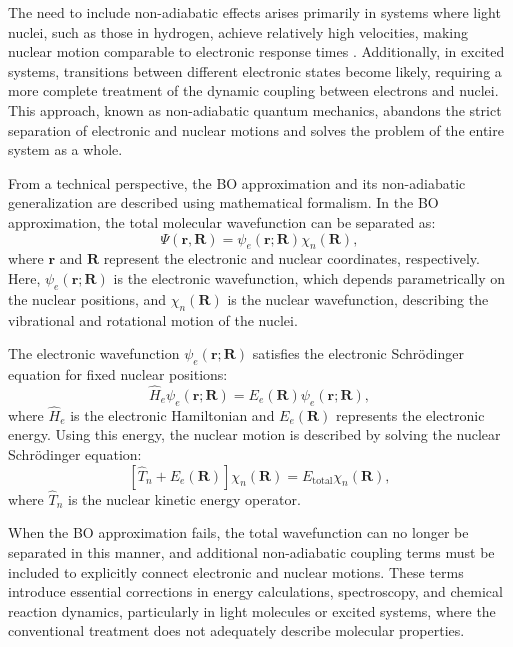 \documentclass[%
 reprint,
 amsmath,amssymb,
 aps,
]{revtex4-2}
\begin{document}
The need to include non-adiabatic effects arises primarily in systems where light nuclei, such as those in hydrogen, achieve relatively high velocities, making nuclear motion comparable to electronic response times \cite{stanke2013relativistic}. Additionally, in excited systems, transitions between different electronic states become likely, requiring a more complete treatment of the dynamic coupling between electrons and nuclei. This approach, known as non-adiabatic quantum mechanics, abandons the strict separation of electronic and nuclear motions and solves the problem of the entire system as a whole.

From a technical perspective, the BO approximation and its non-adiabatic generalization are described using mathematical formalism. In the BO approximation, the total molecular wavefunction can be separated as:
\begin{equation}
\Psi(\mathbf{r}, \mathbf{R}) = \psi_e(\mathbf{r}; \mathbf{R}) \chi_n(\mathbf{R}),
\label{eq:wavefunction}
\end{equation}
where $\mathbf{r}$ and $\mathbf{R}$ represent the electronic and nuclear coordinates, respectively. Here, $\psi_e(\mathbf{r}; \mathbf{R})$ is the electronic wavefunction, which depends parametrically on the nuclear positions, and $\chi_n(\mathbf{R})$ is the nuclear wavefunction, describing the vibrational and rotational motion of the nuclei.

The electronic wavefunction $\psi_e(\mathbf{r}; \mathbf{R})$ satisfies the electronic Schrödinger equation for fixed nuclear positions:
\begin{equation}
\hat{H}_e \psi_e(\mathbf{r}; \mathbf{R}) = E_e(\mathbf{R}) \psi_e(\mathbf{r}; \mathbf{R}),
\label{eq:electronic}
\end{equation}
where $\hat{H}_e$ is the electronic Hamiltonian and $E_e(\mathbf{R})$ represents the electronic energy. Using this energy, the nuclear motion is described by solving the nuclear Schrödinger equation:
\begin{equation}
\left[\hat{T}_n + E_e(\mathbf{R})\right] \chi_n(\mathbf{R}) = E_\text{total} \chi_n(\mathbf{R}),
\label{eq:nuclear}
\end{equation}
where $\hat{T}_n$ is the nuclear kinetic energy operator.

When the BO approximation fails, the total wavefunction can no longer be separated in this manner, and additional non-adiabatic coupling terms must be included to explicitly connect electronic and nuclear motions. These terms introduce essential corrections in energy calculations, spectroscopy, and chemical reaction dynamics, particularly in light molecules or excited systems, where the conventional treatment does not adequately describe molecular properties.
\end{document}
